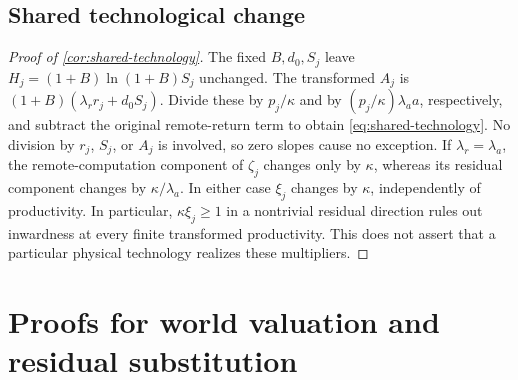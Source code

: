 \documentclass[11pt,a4paper]{article}
\theoremstyle{definition}\newtheorem{definition}{Definition}
\begin{document}
\subsection{Shared technological change}
\label{app:shared-technology-proof}
\begin{proof}[Proof of \cref{cor:shared-technology}]
The fixed $B,d_0,S_j$ leave $H_j=(1+B)\ln(1+B)S_j$ unchanged.
The transformed $A_j$ is $(1+B)(\lambda_r r_j+d_0S_j)$.
Divide these by $p_j/\kappa$ and by
$(p_j/\kappa)\lambda_a a$, respectively, and subtract the original
remote-return term to obtain \cref{eq:shared-technology}.
No division by $r_j$, $S_j$, or $A_j$ is involved, so zero slopes cause
no exception. If $\lambda_r=\lambda_a$, the remote-computation component
of $\zeta_j$ changes only by $\kappa$, whereas its residual component
changes by $\kappa/\lambda_a$. In either case $\xi_j$ changes by
$\kappa$, independently of productivity. In particular,
$\kappa\xi_j\geq1$ in a nontrivial residual direction rules out inwardness
at every finite transformed productivity. This does not assert that a
particular physical technology realizes these multipliers.
\end{proof}

\section{Proofs for world valuation and residual substitution}
\label{app:stage23}
\end{document}

